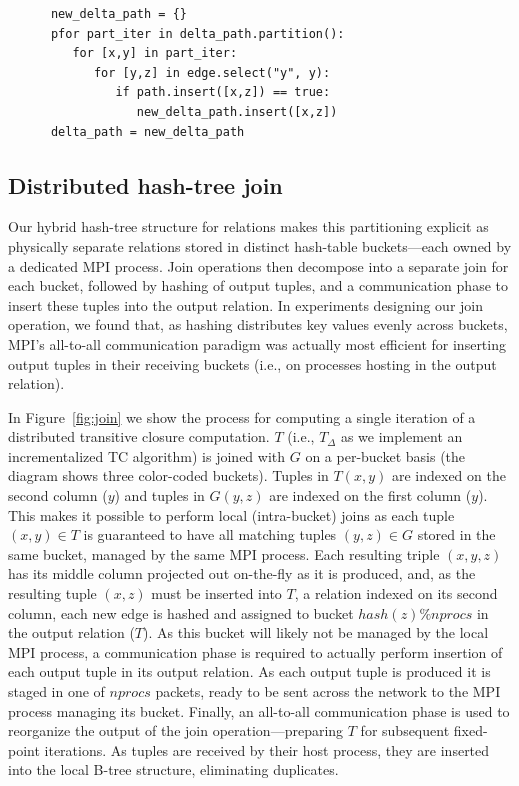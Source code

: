 \begin{verbatim}
      new_delta_path = {}
      pfor part_iter in delta_path.partition():
         for [x,y] in part_iter:
            for [y,z] in edge.select("y", y):
               if path.insert([x,z]) == true:
                  new_delta_path.insert([x,z])
      delta_path = new_delta_path   
\end{verbatim}


\subsection{Distributed hash-tree join}

Our hybrid hash-tree structure for relations makes this partitioning explicit as physically separate relations stored in distinct hash-table buckets---each owned by a dedicated MPI process. Join operations then decompose into a separate join for each bucket, followed by hashing of output tuples, and a communication phase to insert these tuples into the output relation. In experiments designing our join operation, we found that, as hashing distributes key values evenly across buckets, MPI's all-to-all communication paradigm was actually most efficient for inserting output tuples in their receiving buckets (i.e., on processes hosting in the output relation).

In Figure~\ref{fig:join} we show the process for computing a single iteration of a distributed transitive closure computation. $T$ (i.e., $T_\Delta$ as we implement an incrementalized TC algorithm) is joined with $G$ on a per-bucket basis (the diagram shows three color-coded buckets). Tuples in $T(x,y)$ are indexed on the second column ($y$) and tuples in $G(y,z)$ are indexed on the first column ($y$). This makes it possible to perform local (intra-bucket) joins as each tuple $(x,y) \in T$ is guaranteed to have all matching tuples $(y,z) \in G$ stored in the same bucket, managed by the same MPI process. Each resulting triple $(x,y,z)$ has its middle column projected out on-the-fly as it is produced, and, as the resulting tuple $(x,z)$ must be inserted into $T$, a relation indexed on its second column, each new edge is hashed and assigned to bucket $\mathit{hash}(z)\%\mathit{nprocs}$ in the output relation ($T$). As this bucket will likely not be managed by the local MPI process, a communication phase is required to actually perform insertion of each output tuple in its output relation. As each output tuple is produced it is staged in one of $\mathit{nprocs}$ packets, ready to be sent across the network to the MPI process managing its bucket. Finally, an all-to-all communication phase is used to reorganize the output of the join operation---preparing $T$ for subsequent fixed-point iterations. As tuples are received by their host process, they are inserted into the local B-tree structure, eliminating duplicates.  


